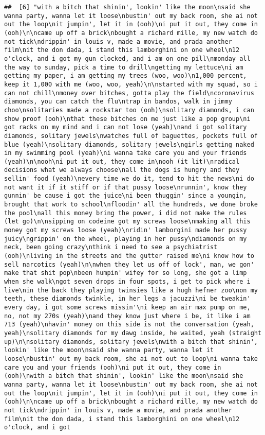\documentclass[]{article}
\begin{document}
\begin{verbatim}
##  [6] "with a bitch that shinin', lookin' like the moon\nsaid she wanna party, wanna let it loose\nbustin' out my back room, she ai not out the loop\nit jumpin', let it in (ooh)\ni put it out, they come in (ooh)\n\ncame up off a brick\nbought a richard mille, my new watch do not tick\ndrippin' in louis v, made a movie, and prada another film\nit the don dada, i stand this lamborghini on one wheel\n12 o'clock, and i got my gun clocked, and i am on one pill\nmonday all the way to sunday, pick a time to drill\ngetting my lettuce\ni am getting my paper, i am getting my trees (woo, woo)\n1,000 percent, keep it 1,000 with me (woo, woo, yeah)\n\nstarted with my squad, so i can not chill\nmoney over bitches, gotta play the field\ncoronavirus diamonds, you can catch the flu\ntrap in bandos, walk in jimmy choo\nsolitaries made a rockstar too (ooh)\nsolitary diamonds, i can show proof (ooh)\nthat these bitches on me just like a pop group\ni got racks on my mind and i can not lose (yeah)\nand i got solitary diamonds, solitary jewels\nwatches full of baguettes, pockets full of blue (yeah)\nsolitary diamonds, solitary jewels\ngirls getting naked in my swimming pool (yeah)\ni wanna take care you and your friends (yeah)\n\nooh\ni put it out, they come in\nooh (it lit)\nradical decisions what we always choose\nall the dogs is hungry and they sellin' food (yeah)\nevery time we do it, tend to hit the news\ni do not want it if it stiff or if that pussy loose\nrunnin', know they gunnin' be cause i got the juice\ni been thuggin' since a youngin, brought that work to school\nfloodin' all the hundreds, we done broke the pool\nall this money bring the power, i did not make the rules (let go)\n\nsipping on codeine got my screws loose\nmaking all this money got my screws loose (yeah)\nridin' lamborgini made her pussy juicy\ngrippin' on the wheel, playing in her pussy\ndiamonds on my neck, been going crazy\nthink i need to see a psychiatrist (ooh)\nliving in the streets and the gutter raised me\ni know how to sell narcotics (yeah)\n\nwhen they let us off of lock', man, we gon' make that shit pop\nbeen humpin' wifey for so long, she got a limp when she walk\ngot seven drops in four spots, i get to pick where i live\nin the back they playing twinsies like a hugh hefner zoo\non my teeth, these diamonds twinkle, in her legs a jacuzzi\ni be tweakin' every day, i got some screws missin'\ni keep an air max pump on me, no, not my 270s (yeah)\nand they know just where i be, it like i am 713 (yeah)\nhavin' money on this side is not the conversation (yeah, yeah)\nsolitary diamonds for my dawg inside, he waited, yeah (straight up)\n\nsolitary diamonds, solitary jewels\nwith a bitch that shinin', lookin' like the moon\nsaid she wanna party, wanna let it loose\nbustin' out my back room, she ai not out to loop\ni wanna take care you and your friends (ooh)\ni put it out, they come in (ooh)\nwith a bitch that shinin', lookin' like the moon\nsaid she wanna party, wanna let it loose\nbustin' out my back room, she ai not out the loop\nit jumpin', let it in (ooh)\ni put it out, they come in (ooh)\n\ncame up off a brick\nbought a richard mille, my new watch do not tick\ndrippin' in louis v, made a movie, and prada another film\nit the don dada, i stand this lamborghini on one wheel\n12 o'clock, and i got 
\end{verbatim}
\end{document}

